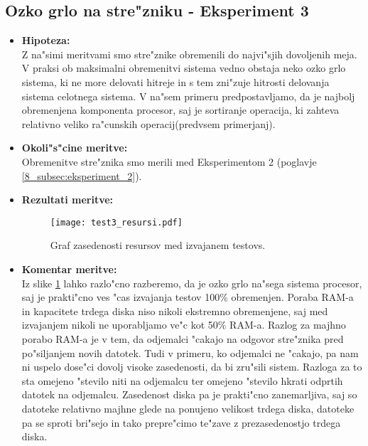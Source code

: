 \newpage
\subsection{Ozko grlo na stre"zniku - Eksperiment 3}
\begin{itemize}
	\item \textbf{Hipoteza: }  \\
		Z na"simi meritvami smo stre"znike obremenili do najvi"sjih dovoljenih meja. V praksi ob maksimalni obremenitvi sistema vedno obstaja neko ozko grlo sistema, ki ne more delovati hitreje in s tem zni"zuje hitrosti delovanja sistema celotnega sistema. V na"sem primeru predpostavljamo, da je najbolj obremenjena komponenta procesor, saj je sortiranje operacija, ki zahteva relativno veliko ra"cunskih operacij(predvsem primerjanj).

	\item \textbf{Okoli"s"cine meritve: } \\
		Obremenitve stre"znika smo merili med Eksperimentom 2 (poglavje \ref{8_subsec:eksperiment_2}).

 	\item \textbf{Rezultati meritve: }  \\
		\begin{figure}[!htb]
  		\centering
  		  \texttt{[image: test3\_resursi.pdf]}
  		\caption{Graf zasedenosti resursov med izvajanem testovs.}
  		\label{8_graf_zasedenost_resursov}
		\end{figure}


	\item \textbf{Komentar meritve: } \\
		Iz slike \ref{8_graf_zasedenost_resursov} lahko razlo"cno razberemo, da je ozko grlo na"sega sistema procesor, saj je prakti"cno ves "cas izvajanja testov 100\% obremenjen. Poraba RAM-a in kapacitete trdega diska niso nikoli ekstremno obremenjene, saj med izvajanjem nikoli ne uporabljamo ve"c kot 50\% RAM-a. Razlog za majhno porabo RAM-a je v tem, da odjemalci "cakajo na odgovor stre"znika pred po"siljanjem novih datotek. Tudi v primeru, ko odjemalci ne "cakajo, pa nam ni uspelo dose"ci dovolj visoke zasedenosti, da bi zru"sili sistem. Razloga za to sta omejeno "stevilo niti na odjemalcu ter omejeno "stevilo hkrati odprtih datotek na odjemalcu. Zasedenost diska pa je prakti"cno zanemarljiva, saj so datoteke relativno majhne glede na ponujeno velikost trdega diska, datoteke pa se sproti bri"sejo in tako prepre"cimo te"zave z prezasedenostjo trdega diska.
\end{itemize}

